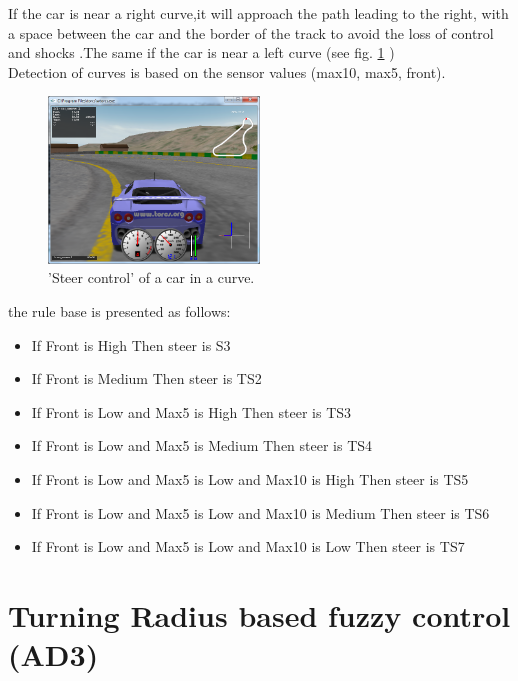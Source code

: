 \documentclass{llncs}
\begin{document}
\begin{enumerate}
	
	
	If the car is near a right curve,it will approach the path leading to the right, with a space between the car and the border of the track to avoid the loss of control and shocks .The same if the car is near a left curve (see fig. \ref {steercont} ) \\
	
	Detection of curves is based on the sensor values (max10, max5, front).
	
	\begin{figure}[h!]
		
		\centering
		\includegraphics[width=0.5\textwidth]{fig/steercont.png}
		\begin{minipage}{10cm}
			\centering
			\caption{\footnotesize 'Steer control' of a car in a curve.}
			\label{steercont}
		\end{minipage} 
	\end{figure}
	the rule base is presented as follows:\\
	\begin{itemize}
		
		\item If Front is High Then steer is S3
		\item If Front is Medium Then steer is TS2
		\item If Front is Low and Max5 is High Then steer is TS3
		\item If Front is Low and Max5 is Medium Then steer is TS4
		\item If Front is Low and Max5 is Low and Max10 is High Then steer is TS5
		\item If Front is Low and Max5 is Low and Max10 is Medium Then steer is TS6
		\item  If Front is Low and Max5 is Low and Max10 is Low Then steer is TS7
		\\
	\end{itemize}	
\end{enumerate}	
\section{{\color{red}Turning Radius based fuzzy control (AD3) }}
\end{document}
